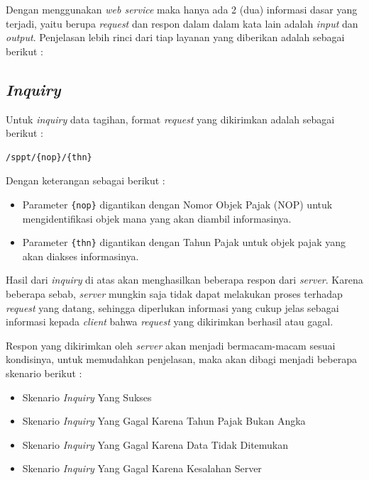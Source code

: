 \documentclass[pdftex,12pt, oneside]{article}
\begin{document}
Dengan menggunakan \textit{web service} maka hanya ada 2 (dua) informasi dasar yang terjadi, yaitu berupa \textit{request} dan respon dalam dalam kata lain adalah \textit{input} dan \textit{output}. Penjelasan lebih rinci dari tiap layanan yang diberikan adalah sebagai berikut :

\subsection{\textit{Inquiry}}

Untuk \textit{inquiry} data tagihan, format \textit{request} yang dikirimkan adalah sebagai berikut :

\begin{lstlisting}
/sppt/{nop}/{thn}
\end{lstlisting}

Dengan keterangan sebagai berikut :

\begin{itemize}
  \item Parameter \texttt{\{nop\}} digantikan dengan Nomor Objek Pajak (NOP) untuk mengidentifikasi objek mana yang akan diambil informasinya.
  \item Parameter \texttt{\{thn\}} digantikan dengan Tahun Pajak untuk objek pajak yang akan diakses informasinya.
\end{itemize}

Hasil dari \textit{inquiry} di atas akan menghasilkan beberapa respon dari \textit{server}. Karena beberapa sebab, \textit{server} mungkin saja tidak dapat melakukan proses terhadap \textit{request} yang datang, sehingga diperlukan informasi yang cukup jelas sebagai informasi kepada \textit{client} bahwa \textit{request} yang dikirimkan berhasil atau gagal. 

Respon yang dikirimkan oleh \textit{server} akan menjadi bermacam-macam sesuai kondisinya, untuk memudahkan penjelasan, maka akan dibagi menjadi beberapa skenario berikut :

\begin{itemize}
  \item Skenario \textit{Inquiry} Yang Sukses
  \item Skenario \textit{Inquiry} Yang Gagal Karena Tahun Pajak Bukan Angka
  \item Skenario \textit{Inquiry} Yang Gagal Karena Data Tidak Ditemukan
  \item Skenario \textit{Inquiry} Yang Gagal Karena Kesalahan Server
\end{itemize}
\end{document}
